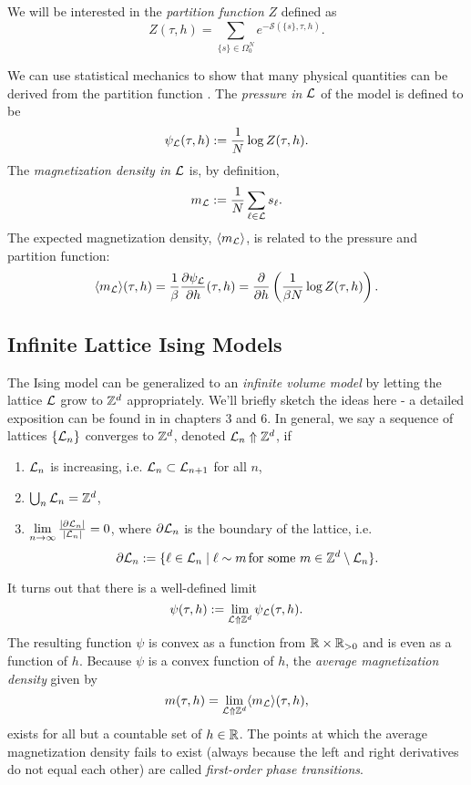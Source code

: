 \documentclass[10pt,reqno]{amsart}
\numberwithin{equation}{section}
\begin{document}
	We will be interested in the \emph{partition function} $Z$ defined as \[Z(\tau,h)=\sum_{\{s\}\in\Omega_0^N}e^{-\mathcal{S}(\{s\},\tau, h)}. \]
	
	We can use statistical mechanics to show that many physical quantities can be derived from the partition function \cite[Ch. 3]{friedli_velenik_2017}.
	The \emph{pressure in $\mathcal{L}$} of the model is defined to be 
	\[\psi_{\mathcal{L}}(\tau,h):=\frac{1}{N} \log Z(\tau,h).  \]
	The \emph{magnetization density in $\mathcal{L}$} is, by definition,
	\[ m_{\mathcal{L}}:=\frac{1}{N}\sum_{\ell \in \mathcal{L}} s_\ell. \]
	The expected magnetization density, $\langle m_{\mathcal{L}} \rangle$, is related to the pressure and partition function:
	\[\langle m_{\mathcal{L}} \rangle (\tau,h) = \frac{1}{\beta}\frac{\partial \psi_{\mathcal{L}}}{\partial h}(\tau, h)=\frac{\partial}{\partial h}\left( \frac{1}{\beta N} \log Z(\tau,h)\right) . \]
	
	
	\subsection{Infinite Lattice Ising Models}
	
	The Ising model can be generalized to an \emph{infinite volume model} by letting the lattice $\mathcal{L}$ grow to $\mathbb{Z}^d$ appropriately. 
	We'll briefly sketch the ideas here - a detailed exposition can be found in \cite{friedli_velenik_2017} in chapters 3 and 6.
	In general, we say a sequence of lattices $\{\mathcal{L}_n \}$ converges to $\mathbb{Z}^d$, denoted $\mathcal{L}_n \Uparrow \mathbb{Z}^d$, if 
	\begin{enumerate}
		\item $\mathcal{L}_n$ is increasing, i.e. $\mathcal{L}_n \subset \mathcal{L}_{n+1}$ for all $n$,
		\item $\bigcup_{n} \mathcal{L}_n = \mathbb{Z}^d$,
		\item $\lim\limits_{n\to \infty} \frac{|\partial \mathcal{L}_n|}{|\mathcal{L}_n|}=0$, where $\partial \mathcal{L}_n$ is the boundary of the lattice, i.e. 
		\[\partial \mathcal{L}_n := \{\ell \in \mathcal{L}_n \mid \ell \sim m \, \text{for some $m$}\in \mathbb{Z}^d \setminus \mathcal{L}_n \}. \]
	\end{enumerate}
	It turns out that there is a well-defined limit 
		\[\psi(\tau,h):= \lim\limits_{\mathcal{L} \Uparrow \mathbb{Z}^d} \psi_{\mathcal{L}}(\tau,h).\]
	The resulting function $\psi$ is convex as a function from $\mathbb{R} \times \mathbb{R}_{>0}$ and is even as a function of $h$.
	Because $\psi$ is a convex function of $h$, the \emph{average magnetization density} given by
		\[m(\tau,h)=\lim_{\mathcal{L} \Uparrow \mathbb{Z}^d} \langle m_{\mathcal{L}} \rangle (\tau, h), \]
	exists for all but a countable set of $h \in \mathbb{R}$.
	The points at which the average magnetization density fails to exist (always because the left and right derivatives do not equal each other) are called \emph{first-order phase transitions}.
		
\end{document}
